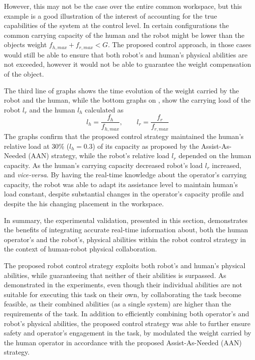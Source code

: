 However, this may not be the case over the entire common workspace, but this example is a good illustration of the interest of accounting for the true capabilities of the system at the control level. In certain configurations the common carrying capacity of the human and the robot might be lower than the objects weight $f_{h,max}+f_{r,max} <G$. The proposed control approach, in those cases would still be able to ensure that both robot's and human's physical abilities are not exceeded, however it would not be able to guarantee the weight compensation of the object. 

The third line of graphs shows the time evolution of the weight carried by the robot and the human, while the bottom graphs on , show the carrying load of the robot $l_r$ and the human $l_h$ calculated as
$$
l_h = \frac{f_h}{f_{h,max}}, \qquad l_r = \frac{f_r}{f_{r,max}}
$$
The graphs confirm that the proposed control strategy maintained the human's relative load at 30\% ($l_h=0.3$) of its capacity as proposed by the Assist-As-Needed (AAN) strategy, while the robot's relative load $l_r$ depended on the human capacity. As the human's carrying capacity decreased robot's load $l_r$ increased, and \textit{vice-versa}. By having the real-time knowledge about the operator's carrying capacity, the robot was able to adapt its assistance level to maintain human's load constant, despite substantial changes in the operator's capacity profile and despite the his changing placement in the workspace. 

In summary, the experimental validation, presented in this section, demonstrates the benefits of integrating accurate real-time information about, both the human operator's and the robot's, physical abilities within the robot control strategy in the context of human-robot physical collaboration.

The proposed robot control strategy exploits both robot's and human's physical abilities, while guaranteeing that neither of their abilities is surpassed. As demonstrated in the experiments, even though their individual abilities are not suitable for executing this task on their own, by collaborating the task become feasible, as their combined abilities (as a single system) are higher than the requirements of the task. In addition to efficiently combining both operator's and robot's physical abilities, the proposed control strategy was able to further ensure safety and operator's engagement in the task, by modulated the weight carried by the human operator in accordance with the proposed Assist-As-Needed (AAN) strategy. 

